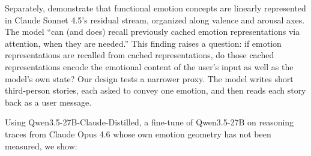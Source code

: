 \documentclass[11pt,a4paper]{article}
\begin{document}
Separately, \citet{anthropic2026emotions} demonstrate that functional emotion concepts are linearly represented in Claude Sonnet 4.5's residual stream, organized along valence and arousal axes. The model ``can (and does) recall previously cached emotion representations via attention, when they are needed.'' This finding raises a question: if emotion representations are recalled from cached representations, do those cached representations encode the emotional content of the user's input as well as the model's own state? Our design tests a narrower proxy. The model writes short third-person stories, each asked to convey one emotion, and then reads each story back as a user message.

Using Qwen3.5-27B-Claude-Distilled, a fine-tune of Qwen3.5-27B on reasoning traces from Claude Opus 4.6 whose own emotion geometry has not been measured, we show:
\end{document}
